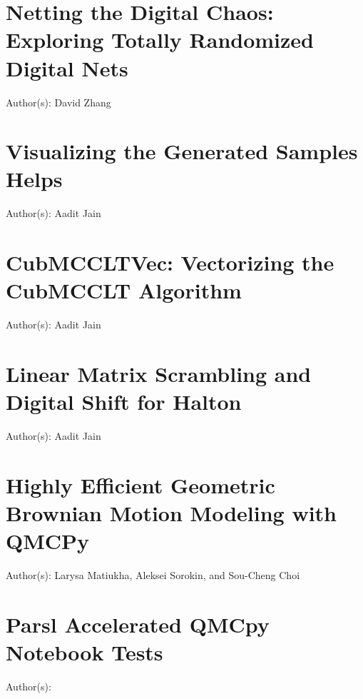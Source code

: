 \documentclass{article}
\newcommand{\blogpost}[5][{}]{\newpage%
\section{#2 {\color{teal}#1}}%
\begin{refsection}%
    \label{#4}%
	Author(s): #3 \newline \newline%
\printbibliography[heading=subbibliography]
\end{refsection}
} %
\theoremstyle{definition}
\begin{document}

 \blogpost{Netting the Digital Chaos: Exploring Totally Randomized Digital Nets}{David Zhang}{}{TotallyRandomDnet/totallyrandomdnet}










\blogpost{Visualizing the Generated Samples Helps}{Aadit Jain}{plotproj}{PlotProjectionsFunction/plotprojectionsfunction}

\blogpost{CubMCCLTVec: Vectorizing the CubMCCLT Algorithm}{Aadit Jain}{cubmccltvec}{CubMCCLTVec/cubmccltvec}

\blogpost{Linear Matrix Scrambling and Digital Shift for Halton}{Aadit Jain}{lms_ds_halton}{LMS_DS_Halton/lms_ds_halton}

\blogpost{Highly Efficient Geometric Brownian Motion Modeling with QMCPy}{Larysa Matiukha, Aleksei Sorokin, and Sou-Cheng Choi}{gbm}{GBM/gbm}

\blogpost{Parsl Accelerated QMCpy Notebook Tests}{\author{Dr. Sou-Cheng Choi (Illinois Tech and SouLab LLC) and Joshua Jay Herman (QMCPy Development Team)}}{parslTestbookQMCblog}{booktests/parslTestbookQMCblog}
\end{document}
